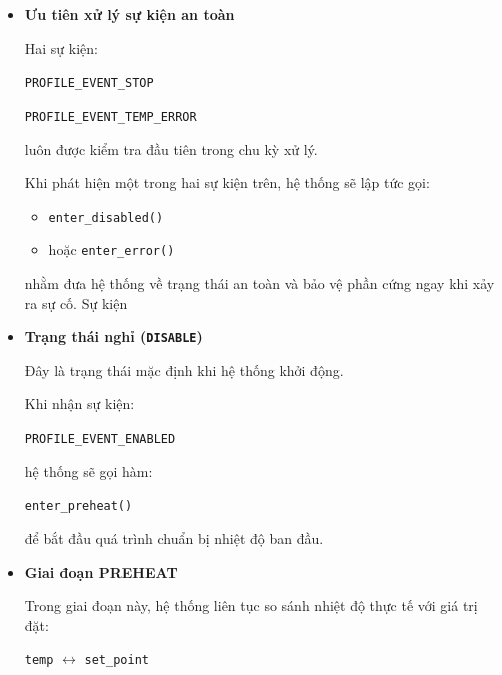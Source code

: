 \begin{itemize}
\begin{itemize}

    \item \textbf{Ưu tiên xử lý sự kiện an toàn}
    
    Hai sự kiện:
    
    \begin{center}
        \texttt{PROFILE\_EVENT\_STOP}
        
        \texttt{PROFILE\_EVENT\_TEMP\_ERROR}
    \end{center}
    
    luôn được kiểm tra đầu tiên trong chu kỳ xử lý.
    
    Khi phát hiện một trong hai sự kiện trên, hệ thống sẽ lập tức gọi:
    
    \begin{itemize}
        \item \texttt{enter\_disabled()}
        \item hoặc \texttt{enter\_error()}
    \end{itemize}
    
    nhằm đưa hệ thống về trạng thái an toàn và bảo vệ phần cứng ngay khi xảy ra sự cố. Sự kiện 

    \item \textbf{Trạng thái nghỉ (\texttt{DISABLE})}
    
    Đây là trạng thái mặc định khi hệ thống khởi động.
    
    Khi nhận sự kiện:
    
    \begin{center}
        \texttt{PROFILE\_EVENT\_ENABLED}
    \end{center}
    
    hệ thống sẽ gọi hàm:
    
    \begin{center}
        \texttt{enter\_preheat()}
    \end{center}
    
    để bắt đầu quá trình chuẩn bị nhiệt độ ban đầu.

    \item \textbf{Giai đoạn PREHEAT}
    
    Trong giai đoạn này, hệ thống liên tục so sánh nhiệt độ thực tế với giá trị đặt:
    
    \begin{center}
        \texttt{temp} $\leftrightarrow$ \texttt{set\_point}
    \end{center}
    

\end{itemize}
\end{itemize}
